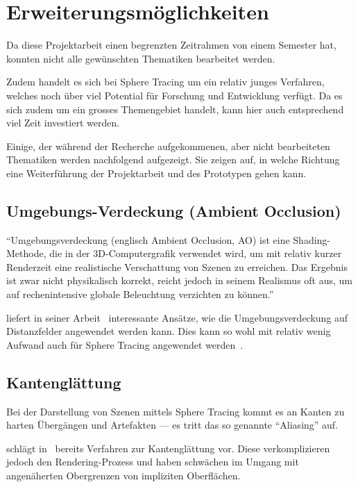 \section{Erweiterungsmöglichkeiten}
\label{sec:further_work}

Da diese Projektarbeit einen begrenzten Zeitrahmen von einem Semester
hat, konnten nicht alle gewünschten Thematiken bearbeitet werden.

Zudem handelt es sich bei Sphere Tracing um ein relativ junges
Verfahren, welches noch über viel Potential für Forschung und
Entwicklung verfügt. Da es sich zudem um ein grosses Themengebiet
handelt, kann hier auch entsprechend viel Zeit investiert werden.

Einige, der während der Recherche aufgekommenen, aber nicht bearbeiteten
Thematiken werden nachfolgend aufgezeigt. Sie zeigen auf, in welche
Richtung eine Weiterführung der Projektarbeit und des Prototypen gehen
kann.

\subsection{Umgebungs-Verdeckung (Ambient Occlusion)}
\label{subsec:further_work:ambient_occlusion}

``Umgebungsverdeckung (englisch Ambient Occlusion, AO) ist eine
Shading-Methode, die in der 3D-Computergrafik verwendet wird, um mit
relativ kurzer Renderzeit eine realistische Verschattung von Szenen zu
erreichen. Das Ergebnis ist zwar nicht physikalisch korrekt, reicht
jedoch in seinem Realismus oft aus, um auf rechenintensive globale
Beleuchtung verzichten zu
können.''~\parencite{wikipedia_the_free_encyclopedia_umgebungsverdeckung_2015}

\citeauthor{evans_fast_2006} liefert in seiner
Arbeit~ interessante Ansätze, wie die
Umgebungsverdeckung auf Distanzfelder angewendet werden kann. Dies kann
so wohl mit relativ wenig Aufwand auch für Sphere Tracing angewendet
werden~\parencite{evans_fast_2006}.

\subsection{Kantenglättung}
\label{subsec:further_work:antialiasing}

Bei der Darstellung von Szenen mittels Sphere Tracing kommt es an Kanten
zu harten Übergängen und Artefakten --- es tritt das so genannte
``Aliasing'' auf.

\citeauthor{hart_sphere_1994} schlägt in~
bereits Verfahren zur Kantenglättung vor. Diese verkomplizieren jedoch
den Rendering-Prozess und haben schwächen im Umgang mit angenäherten
Obergrenzen von impliziten Oberflächen.

